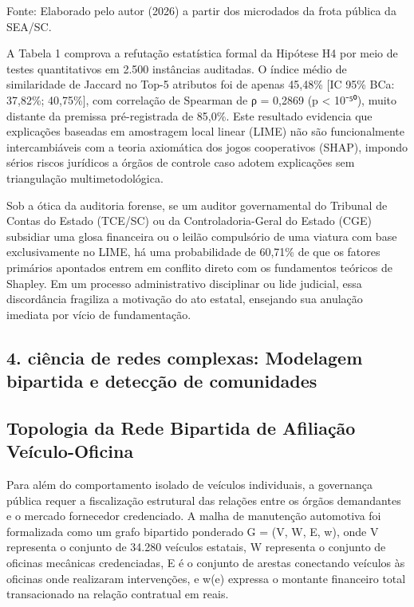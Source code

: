 \documentclass[12pt,a4paper]{article}
\begin{document}
Fonte: Elaborado pelo autor (2026) a partir dos microdados da frota pública da SEA/SC.

A Tabela 1 comprova a refutação estatística formal da Hipótese H4 por meio de testes quantitativos em 2.500 instâncias auditadas. O índice médio de similaridade de Jaccard no Top-5 atributos foi de apenas 45,48\% [IC 95\% BCa: 37,82\%; 40,75\%], com correlação de Spearman de ρ = 0,2869 (p < 10⁻⁵⁰), muito distante da premissa pré-registrada de 85,0\%. Este resultado evidencia que explicações baseadas em amostragem local linear (LIME) não são funcionalmente intercambiáveis com a teoria axiomática dos jogos cooperativos (SHAP), impondo sérios riscos jurídicos a órgãos de controle caso adotem explicações sem triangulação multimetodológica.

Sob a ótica da auditoria forense, se um auditor governamental do Tribunal de Contas do Estado (TCE/SC) ou da Controladoria-Geral do Estado (CGE) subsidiar uma glosa financeira ou o leilão compulsório de uma viatura com base exclusivamente no LIME, há uma probabilidade de 60,71\% de que os fatores primários apontados entrem em conflito direto com os fundamentos teóricos de Shapley. Em um processo administrativo disciplinar ou lide judicial, essa discordância fragiliza a motivação do ato estatal, ensejando sua anulação imediata por vício de fundamentação.


\subsection{4. ciência de redes complexas: Modelagem bipartida e detecção de comunidades}


\subsection{Topologia da Rede Bipartida de Afiliação Veículo-Oficina}

Para além do comportamento isolado de veículos individuais, a governança pública requer a fiscalização estrutural das relações entre os órgãos demandantes e o mercado fornecedor credenciado. A malha de manutenção automotiva foi formalizada como um grafo bipartido ponderado G = (V, W, E, w), onde V representa o conjunto de 34.280 veículos estatais, W representa o conjunto de oficinas mecânicas credenciadas, E é o conjunto de arestas conectando veículos às oficinas onde realizaram intervenções, e w(e) expressa o montante financeiro total transacionado na relação contratual em reais.
\end{document}
